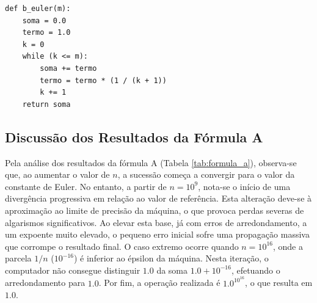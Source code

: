\documentclass{article}
\begin{document}
\begin{center}
\begin{minipage}{0.8\linewidth}
\begin{lstlisting}[style=pythoncode]
def b_euler(m):
    soma = 0.0
    termo = 1.0
    k = 0
    while (k <= m):
        soma += termo
        termo = termo * (1 / (k + 1))
        k += 1
    return soma
\end{lstlisting}
\end{minipage}
\end{center}
\pagebreak

\subsection{Discussão dos Resultados da Fórmula A}

Pela análise dos resultados da fórmula A (Tabela \ref{tab:formula_a}), 
observa-se que, ao aumentar o valor de $n$, a sucessão começa a convergir 
para o valor da constante de Euler. No entanto, a partir de $n=10^{9}$, 
nota-se o início de uma divergência progressiva em relação ao valor de 
referência. Esta alteração deve-se à aproximação ao limite de precisão 
da máquina, o que provoca perdas severas de algarismos significativos. 
Ao elevar esta base, já com erros de arredondamento, a um expoente muito 
elevado, o pequeno erro inicial sofre uma propagação massiva que corrompe 
o resultado final. O caso extremo ocorre quando $n=10^{16}$, onde a parcela 
$1/n$ ($10^{-16}$) é inferior ao épsilon da máquina. Nesta iteração,
o computador não consegue distinguir $1.0$ da soma $1.0 + 10^{-16}$, 
efetuando o arredondamento para $1.0$. Por fim, a operação realizada 
é $1.0^{10^{16}}$, o que resulta em $1.0$.
\bigskip
\end{document}

